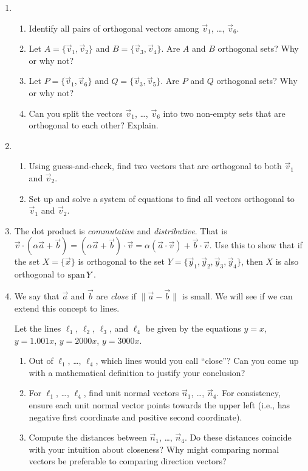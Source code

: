 \begin{enumerate}
	\item
	\begin{enumerate}
		\item Identify all pairs of orthogonal vectors among $\vec v_1$, \ldots, $\vec v_6$.
		\item Let $A=\{\vec v_1, \vec v_2\}$ and $B=\{\vec v_3,\vec v_4\}$. Are $A$ and $B$ orthogonal sets?
			Why or why not?
		\item Let $P=\{\vec v_1, \vec v_6\}$ and $Q=\{\vec v_3,\vec v_5\}$. Are $P$ and $Q$ orthogonal sets?
			Why or why not?
		\item Can you split the vectors $\vec v_1$, \ldots, $\vec v_6$ into two non-empty sets that are orthogonal to
			each other? Explain.
	\end{enumerate}
	\item
	\begin{enumerate}
		\item Using guess-and-check, find two vectors that are orthogonal to both $\vec v_1$ and $\vec v_2$.
		\item Set up and solve a system of equations to find all vectors orthogonal to $\vec v_1$ and $\vec v_2$.
	\end{enumerate}
	\item The dot product is \emph{commutative} and \emph{distributive}. That is $\vec v\cdot (\alpha\vec a+\vec b)=
		(\alpha\vec a+\vec b)\cdot \vec v=\alpha(\vec a\cdot \vec v)+\vec b\cdot\vec v$. Use this to show that if
		the set $X=\{\vec x\}$ is orthogonal to the set $Y=\{\vec y_1,\vec y_2,\vec y_3,\vec y_4\}$,
		then $X$ is also orthogonal to $\operatorname{span} Y$.
	
	\item We say that $\vec a$ and $\vec b$ are \emph{close} if $\|\vec a-\vec b\|$ is small. We will see if we can
		extend this concept to lines.

		Let the lines $\ell_1$, $\ell_2$, $\ell_3$, and $\ell_4$ be given by the equations $y=x$, $y=1.001x$,
				$y=2000x$, $y=3000x$.
		\begin{enumerate}
			\item Out of $\ell_1$, \ldots, $\ell_4$, which lines would you call ``close''? Can you come up
				with a mathematical definition to justify your conclusion?
			\item For $\ell_1$, \ldots, $\ell_4$, find unit normal vectors $\vec n_1$, \ldots, $\vec n_4$.
				For consistency, ensure each unit normal vector points towards the upper left (i.e., has negative first coordinate
				and positive second coordinate).
			\item Compute the distances between $\vec n_1$, \ldots, $\vec n_4$. Do these distances coincide with your
				intuition about closeness? Why might comparing normal vectors be preferable to comparing direction vectors?
		\end{enumerate}
	
\end{enumerate}